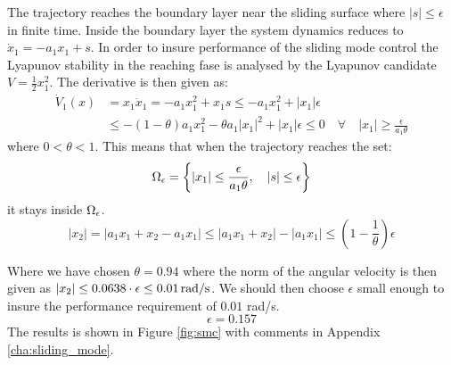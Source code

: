 The trajectory reaches the boundary layer near the sliding surface where $|s| \leq \epsilon$ in finite time. Inside the boundary layer the system dynamics reduces to $\dot{x}_1 = -a_1 x_1 + s$. In order to insure performance of the sliding mode control the Lyapunov stability in the reaching fase is analysed by the Lyapunov candidate $V = \frac{1}{2} x_1^2$. The derivative is then given as:
\begin{equation}
        \begin{split}
                \dot{V}_1(x) &= x_1 \dot{x}_1 = -a_1 x_1^2 + x_1 s \leq -a_1 x_1^2 + |x_1| \epsilon \\
                &\leq -(1-\theta)a_1 x_1^2 - \theta a_1|x_1|^2 + |x_1|\epsilon \leq 0 \quad \forall \quad |x_1| \geq \frac{\epsilon}{a_1 \theta}
        \end{split}
\end{equation}
where $0 < \theta < 1$. This means that when the trajectory reaches the set:
\begin{equation}
        \Omega_{\mathrm{\epsilon}} = \left\{|x_1| \leq \frac{\epsilon}{a_1 \theta}, \quad |s| \leq \epsilon \right\}
\end{equation}
it stays inside $\Omega_{\mathrm{\epsilon}}$. 
\begin{equation}
        |x_2| = |a_1 x_1 + x_2 - a_1 x_1| \leq |a_1 x_1 + x_2| - |a_1 x_1| \leq \left(1 - \frac{1}{\theta}\right)\epsilon
\end{equation}

Where we have chosen $\theta = 0.94$ where the norm of the angular velocity is then given as $|x_2| \leq 0.0638 \cdot \epsilon \leq 0.01 \, \text{rad/s}$. We should then choose $\epsilon$ small enough to insure the performance requirement of $0.01$ rad/s.
\begin{equation}
         \epsilon = 0.157 \nonumber
 \end{equation} 
 The results is shown in Figure \ref{fig:smc} with comments in Appendix \ref{cha:sliding_mode}.

